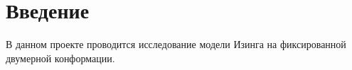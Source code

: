 \section{Введение}
В данном проекте проводится исследование модели Изинга на фиксированной двумерной конформации. 